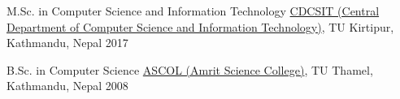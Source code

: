 

\begin{cventries}

  \cventry
    {M.Sc. in Computer Science and Information Technology} %
    {\href{http://cdcsit.edu.np/}{CDCSIT (Central Department of Computer Science and Information Technology)}, TU} %
    {Kirtipur, Kathmandu, Nepal} %
    {2017} %
    {}  
    
    \cventry
    {B.Sc. in Computer Science} %
    {\href{https://amritcampus.edu.np/} {ASCOL (Amrit Science College)}, TU} %
    {Thamel, Kathmandu, Nepal} %
    {2008} %
    {}
\end{cventries}
